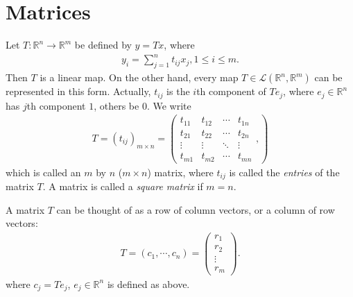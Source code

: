 \documentclass[11pt]{book}
\theoremstyle{definition}
\numberwithin{equation}{chapter}
\begin{document}
\chapter{Matrices}
Let $T:\mathbb{R}^n\to\mathbb{R}^m$ be defined by $y = T x$, where
\begin{align*}
    y_i = \sum^n_{j=1} t_{ij}x_j, 1\leq i\leq m.
\end{align*}
Then $T$ is a linear map. On the other hand, every map $T\in \mathscr{L}(\mathbb{R}^n,\mathbb{R}^m)$ can be represented in this form. Actually, $t_{ij}$ is the $i$th component of $Te_j$, where $e_j\in \mathbb{R}^n$ has $j$th component $1$, others be $0$. We write
\begin{align*}
    T = (t_{ij})_{m\times n} = \left(
        \begin{matrix}
        t_{11} & t_{12} & \cdots & t_{1n}\\
        t_{21} & t_{22} & \cdots & t_{2n}\\
        \vdots & \vdots & \ddots & \vdots\\
        t_{m1} & t_{m2} & \cdots & t_{mn}
        \end{matrix},
    \right)
\end{align*}
which is called an $m$ by $n$ ($m\times n$) matrix, where $t_{ij}$ is called the \emph{entries} of the matrix $T$. A matrix is called a \emph{square matrix} if $m=n$. 

A matrix $T$ can be thought of as a row of column vectors, or a column of row vectors: 
\begin{align*}
    T = (c_1,\cdots,c_n) = \left(
    \begin{matrix}
        r_1 \\
        r_2 \\
        \vdots \\
        r_m 
        \end{matrix}
    \right).
\end{align*}
where $c_j = T e_j$, $e_j\in\mathbb{R}^n$ is defined as above.

\medskip
\end{document}

